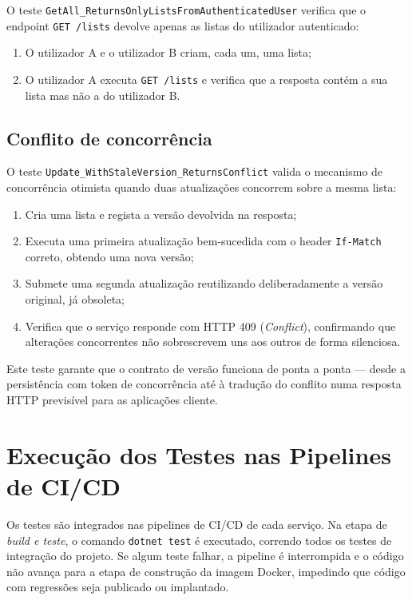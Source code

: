 O teste \texttt{GetAll\_ReturnsOnlyListsFromAuthenticatedUser} verifica que o endpoint \texttt{GET /lists} devolve apenas as listas do utilizador autenticado:

\begin{enumerate}
    \item O utilizador A e o utilizador B criam, cada um, uma lista;
    \item O utilizador A executa \texttt{GET /lists} e verifica que a resposta contém a sua lista mas não a do utilizador B.
\end{enumerate}

\subsection{Conflito de concorrência}
\label{sec:6.3.4}

O teste \texttt{Update\_WithStaleVersion\_ReturnsConflict} valida o mecanismo de concorrência otimista quando duas atualizações concorrem sobre a mesma lista:

\begin{enumerate}
    \item Cria uma lista e regista a versão devolvida na resposta;
    \item Executa uma primeira atualização bem-sucedida com o header \texttt{If-Match} correto, obtendo uma nova versão;
    \item Submete uma segunda atualização reutilizando deliberadamente a versão original, já obsoleta;
    \item Verifica que o serviço responde com HTTP 409 (\textit{Conflict}), confirmando que alterações concorrentes não sobrescrevem uns aos outros de forma silenciosa.
\end{enumerate}

Este teste garante que o contrato de versão funciona de ponta a ponta — desde a persistência com token de concorrência até à tradução do conflito numa resposta HTTP previsível para as aplicações cliente.

\section{Execução dos Testes nas Pipelines de CI/CD}
\label{sec:6.4}

Os testes são integrados nas pipelines de \ac{CI/CD} de cada serviço. Na etapa de \textit{build e teste}, o comando \texttt{dotnet test} é executado, correndo todos os testes de integração do projeto. Se algum teste falhar, a pipeline é interrompida e o código não avança para a etapa de construção da imagem Docker, impedindo que código com regressões seja publicado ou implantado.

